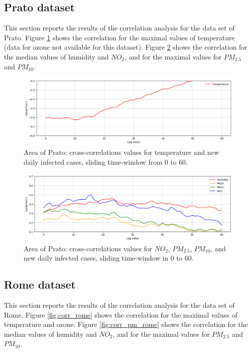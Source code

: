 \documentclass[review]{elsarticle}
\begin{document}
\newpage \subsection{Prato dataset}
This section reports the results of the correlation analysis for the data set of Prato. 		Figure \ref{fig:corr_prato} shows the correlation for the maximal values of temperature 
 (data for ozone not available for this dataset).
	Figure \ref{fig:corr_pm_prato} shows the correlation for the median values of humidity and $NO_{2}$, and for the 		maximal values for $PM_{2.5}$ and $PM_{10}$.
\begin{figure}[htp] 	\centering 	\includegraphics[width=1\linewidth]{img/corr_temp_prato.png} 	\caption{Area of Prato: cross-correlations values for temperature 
 and new daily infected cases, sliding time-window from $0$ to $60$.} 	\label{fig:corr_prato} \end{figure} 
 \begin{figure}[htp]	\centering	\includegraphics[width=1\linewidth]{img/corr_pm_prato.png}	\caption{Area of Prato: cross-correlations values for $NO_{2}$, $PM_{2.5}$, $PM_{10}$, and new daily infected cases, sliding time-window in $0$ to $60$.}	\label{fig:corr_pm_prato} \end{figure}
\newpage \subsection{Rome dataset}
This section reports the results of the correlation analysis for the data set of Rome. 		Figure \ref{fig:corr_rome} shows the correlation for the maximal values of temperature 
 and ozone.
	Figure \ref{fig:corr_pm_rome} shows the correlation for the median values of humidity and $NO_{2}$, and for the 		maximal values for $PM_{2.5}$ and $PM_{10}$.
\end{document}
